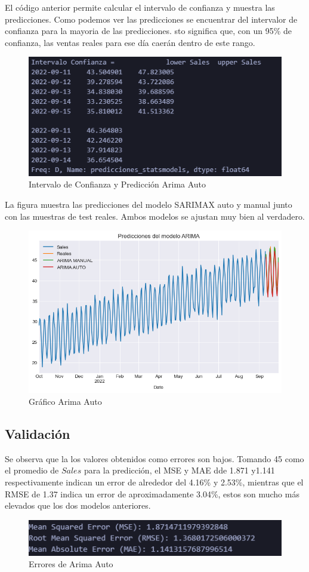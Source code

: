 El código anterior permite calcular el intervalo de confianza y muestra las predicciones. Como podemos ver las predicciones se encuentrar del intervalor de confianza para la mayoria de las predicciones. sto significa que, con un 95\% de confianza, las ventas reales para ese día caerán dentro de este rango.

\begin{figure}[!h]
	\centering
	\includegraphics[width=0.5\linewidth]{confianza_sarimax_auto}
	\caption{Intervalo de Confianza y Predicción Arima Auto}
	\label{fig:confianzasarimaxauto}
\end{figure}

La figura muestra las predicciones del modelo SARIMAX auto y manual junto con las muestras de test reales. Ambos modelos se ajustan muy bien al verdadero.

\begin{figure}[!h]
	\centering
	\includegraphics[width=0.7\linewidth]{auto_arima}
	\caption{Gráfico Arima Auto}
	\label{fig:autoarima}
\end{figure}


\subsection{Validación}
Se observa que la los valores obtenidos como errores son  bajos. Tomando 45 como el promedio de $Sales$ para la predicción, el MSE y MAE dde 1.871 y1.141 respectivamente indican un error de alrededor del 4.16\% y 2.53\%, mientras que el RMSE de 1.37 indica un error de aproximadamente 3.04\%, estos son mucho más elevados que los dos modelos anteriores.
\begin{figure}[h]
	\centering
	\includegraphics[width=0.7\linewidth]{errores_auto_arima}
	\caption{Errores de Arima Auto}
	\label{fig:erroresautoarima}
\end{figure}

